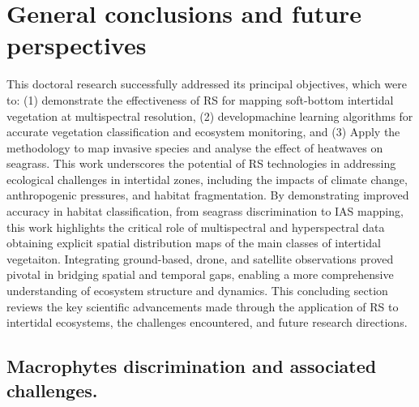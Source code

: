 \documentclass[
  letterpaper,
  11pt,
  english,
  singlespacing,
  headsepline]{MastersDoctoralThesis}
\begin{document}
\newpage\null\thispagestyle{empty}\newpage


\chapter{General conclusions and future
perspectives}\label{general-conclusions-and-future-perspectives}

\begin{spacing}{1.5}

This doctoral research successfully addressed its principal objectives,
which were to: (1) demonstrate the effectiveness of RS for mapping
soft-bottom intertidal vegetation at multispectral resolution, (2)
developmachine learning algorithms for accurate vegetation
classification and ecosystem monitoring, and (3) Apply the methodology
to map invasive species and analyse the effect of heatwaves on seagrass.
This work underscores the potential of RS technologies in addressing
ecological challenges in intertidal zones, including the impacts of
climate change, anthropogenic pressures, and habitat fragmentation. By
demonstrating improved accuracy in habitat classification, from seagrass
discrimination to IAS mapping, this work highlights the critical role of
multispectral and hyperspectral data obtaining explicit spatial
distribution maps of the main classes of intertidal vegetaiton.
Integrating ground-based, drone, and satellite observations proved
pivotal in bridging spatial and temporal gaps, enabling a more
comprehensive understanding of ecosystem structure and dynamics. This
concluding section reviews the key scientific advancements made through
the application of RS to intertidal ecosystems, the challenges
encountered, and future research directions.

\section{Macrophytes discrimination and associated
challenges.}\label{macrophytes-discrimination-and-associated-challenges.}


\end{spacing}
\end{document}
